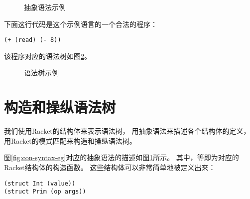\begin{figure}[t]
  \caption{抽象语法示例}
  \label{fig:abs-syntax-eg}
\end{figure}


下面这行代码是这个示例语言的一个合法的程序：

\begin{lstlisting}
(+ (read) (- 8))
\end{lstlisting}

该程序对应的语法树如图\ref{fig:ast-eg}。

\begin{figure}[t]
  \begin{center}
  \end{center}
  \caption{语法树示例}
  \label{fig:ast-eg}
\end{figure}

\section{构造和操纵语法树}

我们使用Racket的结构体来表示语法树，
用抽象语法来描述各个结构体的定义，
用Racket的模式匹配来构造和操纵语法树。

图\ref{fig:con-syntax-eg}对应的抽象语法的描述如图\ref{fig:abs-syntax-eg}所示。
其中，等即为对应的Racket结构体的构造函数。
这些结构体可以非常简单地被定义出来：
\begin{lstlisting}
(struct Int (value))
(struct Prim (op args))
\end{lstlisting}

